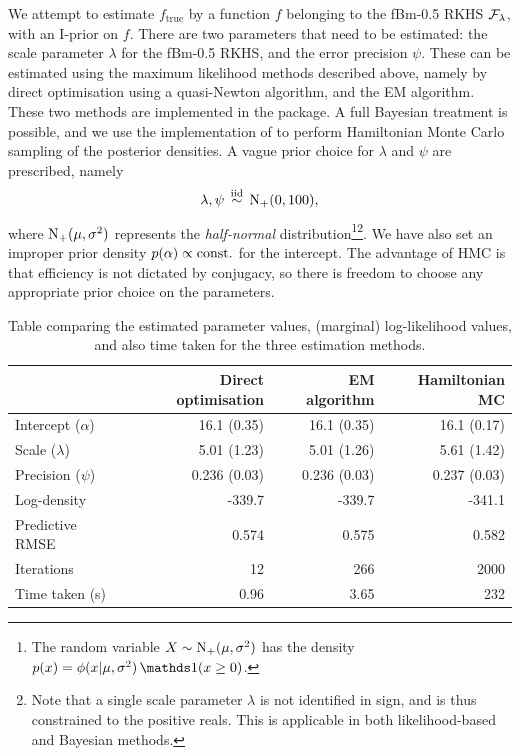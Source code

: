 We attempt to estimate $f_\text{true}$ by a function $f$ belonging to the fBm-0.5 RKHS ${\mathcal F}_\lambda$, with an I-prior on $f$.
There are two parameters that need to be estimated: the scale parameter $\lambda$ for the fBm-0.5 RKHS, and the error precision $\psi$.
These can be estimated using the maximum likelihood methods described above, namely by direct optimisation using a quasi-Newton algorithm, and the EM algorithm.
These two methods are implemented in the  package. 
A full Bayesian treatment is possible, and we use the  implementation of  to perform Hamiltonian Monte Carlo sampling of the posterior densities.
A vague prior choice for $\lambda$ and $\psi$ are prescribed, namely
\[
  \lambda,\psi \,\overset{\text{iid}}{\sim}\, \operatorname{N}_+(0,100),
\]
where $\operatorname{N}_+(\mu,\sigma^2)$ represents the \emph{half-normal} distribution\footnote{The random variable $X \sim \operatorname{N}_+(\mu,\sigma^2)$ has the density $p(x) = \phi(x|\mu,\sigma^2)\ind(x \geq 0)$.}\footnote{Note that a single scale parameter $\lambda$ is not identified in sign, and is thus constrained to the positive reals. This is applicable in both likelihood-based and Bayesian methods.}.
We have also set an improper prior density $p(\alpha) \propto \text{const.}\hspace{0.01em}$ for the intercept.
The advantage of HMC is that efficiency is not dictated by conjugacy, so there is freedom to choose any appropriate prior choice on the parameters.

\begin{table}[hbt]
\centering
\caption{Table comparing the estimated parameter values, (marginal) log-likelihood values, and also time taken for the three estimation methods.}
\label{tab:comparemethodsestimate}
\begin{tabular}{@{}lrrr@{}}
\toprule
               & Direct optimisation & EM algorithm & Hamiltonian MC          \\ \midrule
Intercept ($\alpha$)      & 16.1 (0.35)           & 16.1 (0.35)    & 16.1 (0.17)  \\
Scale ($\lambda$)      & 5.01 (1.23)         & 5.01 (1.26)  & 5.61 (1.42)     \\
Precision ($\psi$)         & 0.236 (0.03)        & 0.236 (0.03) & 0.237 (0.03)\\[0.5em]
Log-density    & -339.7              & -339.7       & -341.1                  \\
Predictive RMSE & 0.574               & 0.575        & 0.582                   \\[0.5em]
Iterations     & 12                  & 266          & 2000                    \\
Time taken (s) & 0.96                & 3.65         & 232                     \\ \bottomrule
\end{tabular}
\end{table}

